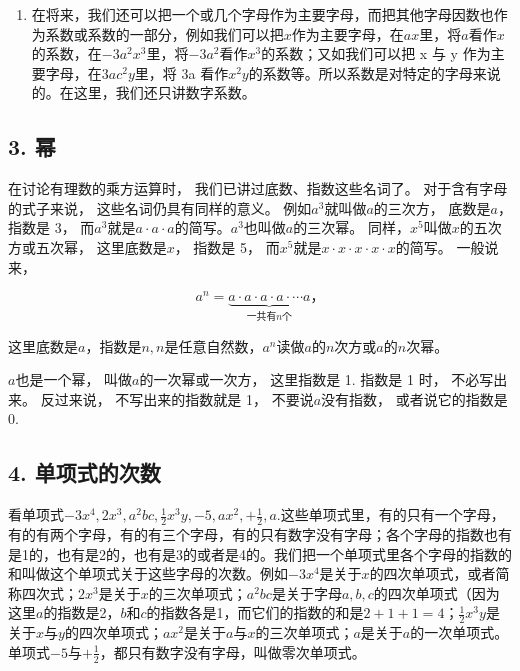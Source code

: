 \begin{enumerate}[start=2]
\item
  在将来，我们还可以把一个或几个字母作为主要字母，而把其他字母因数也作为系数或系数的一部分，例如我们可以把\(x\)作为主要字母，在\(ax\)里，将\(a\)看作\(x\)的系数，在\(-3a^2 x^3\)里，将\(-3a^2\)看作\(x^{3}\)的系数；又如我们可以把
  x 与 y 作为主要字母，在\(3ac^{2}y\)里，将 3a
  看作\(x^{2}y\)的系数等。所以系数是对特定的字母来说的。在这里，我们还只讲数字系数。
\end{enumerate}

\subsection{3. 幂}

在讨论有理数的乘方运算时， 我们已讲过底数、指数这些名词了。
对于含有字母的式子来说， 这些名词仍具有同样的意义。
例如\(a^3\)就叫做\(a\)的三次方， 底数是\(a\)， 指数是 3，
而\(a^3\)就是\(a \cdot a \cdot a\)的简写。\(a^3\)也叫做\(a\)的三次幂。
同样，\(x^5\)叫做\(x\)的五次方或五次幂， 这里底数是\(x\)， 指数是 5，
而\(x^5\)就是\(x \cdot x \cdot x \cdot x \cdot x\)的简写。 一般说来，

\[
a ^{n} = \underbrace {a \cdot a \cdot a \cdot a \cdot \cdots a} _{\text{一共有} n \text{个}}\text{，}
\]

这里底数是\(a\)，指数是\(n, n\)是任意自然数，\(a^n\)读做\(a\)的\(n\)次方或\(a\)的\(n\)次幂。

\(a\)也是一个幂， 叫做\(a\)的一次幂或一次方，
这里指数是 1. 指数是 1 时， 不必写出来。 反过来说， 不写出来的指数就是
1， 不要说\(a\)没有指数， 或者说它的指数是 0.

\subsection{4. 单项式的次数}

看单项式\(-3x^{4}, 2x^{3}, a^{2}bc, \frac{1}{2}x^{3}y, -5, ax^{2}, +\frac{1}{2}, a.\)这些单项式里，有的只有一个字母，有的有两个字母，有的有三个字母，有的只有数字没有字母；各个字母的指数也有是1的，也有是2的，也有是3的或者是4的。我们把一个单项式里各个字母的指数的和叫做这个单项式关于这些字母的次数。例如\(-3x^{4}\)是关于\(x\)的四次单项式，或者简称四次式；\(2x^{3}\)是关于\(x\)的三次单项式；\(a^{2}bc\)是关于字母\(a, b, c\)的四次单项式（因为这里\(a\)的指数是2，\(b\)和\(c\)的指数各是1，而它们的指数的和是\(2 + 1 + 1 = 4\)；\(\frac{1}{2} x^3 y\)是关于\(x\)与\(y\)的四次单项式；\(ax^2\)是关于\(a\)与\(x\)的三次单项式；\(a\)是关于\(a\)的一次单项式。单项式\(-5\)与\(+\frac{1}{2}\)，都只有数字没有字母，叫做零次单项式。

